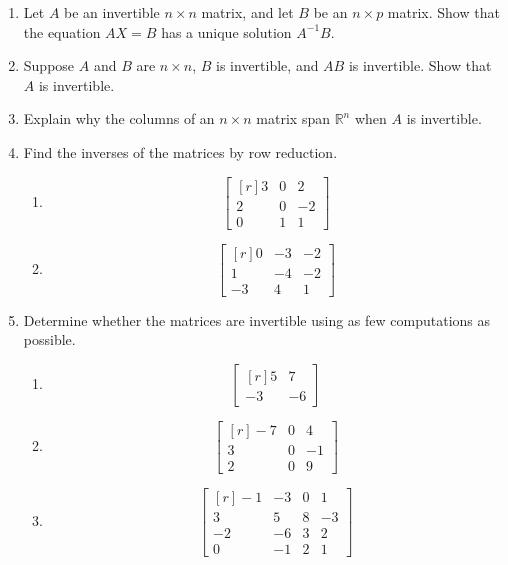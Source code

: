\documentclass[12pt]{article}
\begin{document}
\begin{multicols*}{2}
\begin{enumerate}
		\item Let $A$ be an invertible $n\times n$ matrix, and let $B$ be an $n\times p$ matrix. Show that the equation $AX=B$ has a unique solution $A^{-1}B$.
		\vfill

		\item Suppose $A$ and $B$ are $n\times n$, $B$ is invertible, and $AB$ is invertible. Show that $A$ is invertible.
		\vfill

		\item Explain why the columns of an $n\times n$ matrix span $\mathbb{R}^n$ when $A$ is invertible.
		\vfill

		\item Find the inverses of the matrices by row reduction.
		\begin{enumerate}
			\item \[
			\begin{bmatrix*}[r]
				3 & 0 & 2\\
				2 & 0 & -2\\
				0 & 1 & 1
			\end{bmatrix*}
			\]
			\vfill

			\item \[
			\begin{bmatrix*}[r]
				0 & -3 & -2\\
				1 & -4 & -2\\
				-3 & 4 & 1	
			\end{bmatrix*}
			\]
		\end{enumerate}
		\vfill\null\pagebreak

		\item Determine whether the matrices are invertible using as few computations as possible.
		\begin{enumerate}
			\item \[
			\begin{bmatrix*}[r]
				5 & 7\\
				-3 & -6
			\end{bmatrix*}
			\]
			\vfill
			\item \[
			\begin{bmatrix*}[r]
				-7 & 0 & 4\\
				3 & 0 & -1\\
				2 & 0 & 9	
			\end{bmatrix*}
			\]
			\vfill
			\item \[
			\begin{bmatrix*}[r]
				-1 & -3 & 0 & 1\\
				3 & 5 & 8 & -3\\
				-2 & -6 & 3 & 2\\
				0 & -1 & 2 & 1
			\end{bmatrix*}
			\]
		\end{enumerate}
		\vfill


\end{enumerate}
\end{multicols*}
\end{document}
